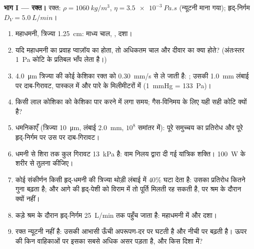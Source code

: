 \begin{problem}
\label{pb:b2:viscous-flows:1}

\medskip
\noindent\textbf{भाग I --- रक्त।}
रक्त: $\rho = \qty{1060}{kg/m^3}$, $\eta = \qty{3.5e-3}{Pa.s}$ (न्यूटनी
माना गया); हृद्-निर्गम $D_V = \qty{5.0}{L/min}$।
\begin{enumerate}
  \item महाधमनी, त्रिज्या \qty{1.25}{cm}: माध्य चाल, , दशा।
  \item यदि महाधमनी का प्रवाह प्वाज़ॉय का होता, तो अधिकतम चाल और
        दीवार का  क्या होते? (अंतःस्तर
        \qty{1}{Pa} कोटि के प्रतिबल भाँप लेता है।)
  \item \qty{4.0}{\micro m} त्रिज्या की कोई केशिका रक्त को
        \qty{0.30}{mm/s} से ले जाती है: ; उसकी
        \qty{1.0}{mm} लंबाई पर दाब-गिरावट, पास्कल में और पारे के मिलीमीटरों में
        (\qty{1}{mmHg} = \qty{133}{Pa})।
  \item किसी लाल कोशिका को केशिका पार करने में लगा समय; गैस-विनिमय
        के लिए यही सही कोटि क्यों है?
  \item धमनिकाएँ (त्रिज्या \qty{10}{\micro m}, लंबाई \qty{2.0}{mm}, $10^8$
        समांतर में): पूरे समुच्चय का प्रतिरोध और पूरे हृद्-निर्गम पर
        उस पर दाब-गिरावट।
  \item धमनी से शिरा तक कुल गिरावट \qty{13}{kPa} है: वाम निलय द्वारा दी गई
        यांत्रिक शक्ति। \qty{100}{W} के शरीर से
        तुलना कीजिए।
  \item कोई संकीर्णन किसी हृद्-धमनी की त्रिज्या थोड़ी लंबाई में $40\%$
        घटा देता है: उसका प्रतिरोध कितने गुना बढ़ता है; और आगे की
        हृद्-पेशी को विराम में तो पूर्ति मिलती रह सकती है, पर
        श्रम के दौरान क्यों नहीं।
  \item कड़े श्रम के दौरान हृद्-निर्गम \qty{25}{L/min} तक पहुँच जाता है:
        महाधमनी में  और दशा।
  \item रक्त न्यूटनी नहीं है: उसकी आभासी  ऊँची
        अपरूपण-दर पर घटती है और नीची पर बढ़ती है। ऊपर की किन
        वाहिकाओं पर इसका सबसे अधिक असर पड़ता है, और किस दिशा में?
\end{enumerate}


\end{problem}
